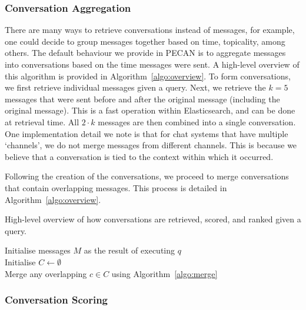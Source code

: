 \subsubsection{Conversation Aggregation}
\label{sec:conv-agg}

There are many ways to retrieve conversations instead of messages, for example, one could decide to group messages together based on time, topicality, among others. The default behaviour we provide in PECAN is to aggregate messages into conversations based on the time messages were sent. A high-level overview of this algorithm is provided in Algorithm~\ref{algo:overview}. To form conversations, we first retrieve individual messages given a query. Next, we retrieve the $k=5$ messages that were sent before and after the original message (including the original message). This is a fast operation within Elasticsearch, and can be done at retrieval time. All $2 \cdot k$ messages are then combined into a single conversation. One implementation detail we note is that for chat systems that have multiple `channels', we do not merge messages from different channels. This is because we believe that a conversation is tied to the context within which it occurred.

Following the creation of the conversations, we proceed to merge conversations that contain overlapping messages. This process is detailed in Algorithm~\ref{algo:overview}.

\setlength{\textfloatsep}{0pt}
\begin{algorithm}[t!]
	\SetAlgoLined
	\caption{High-level overview of how conversations are retrieved, scored, and ranked given a query.}
	\label{algo:overview}
	Initialise messages $M$ as the result of executing $q$\\
	Initialise $C\gets\emptyset$\\ 
	Merge any overlapping $c\in C$ using Algorithm~\ref{algo:merge}\\
\end{algorithm}	

	
		
\subsubsection{Conversation Scoring}
\label{sec:conv-scoring}

